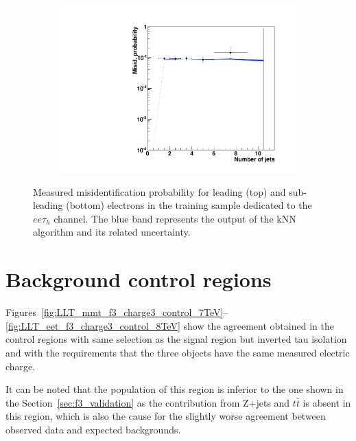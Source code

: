 \begin{figure}
\begin{subfigure}[b]{0.33\textwidth}
                \includegraphics[width=\textwidth]{4_Analisys/pics/8TeV/plots/fakerates/e_eet_subleading_kNN_numJets20.pdf}
                \caption{}
        \end{subfigure}
        \caption{Measured misidentification probability for leading (top) and sub-leading (bottom) electrons in the training sample dedicated to the $ee\tau_h$ channel. The blue band represents the output of the kNN algorithm and its related uncertainty.}\label{fig:fake_rate_eet}
\end{figure}

\section{Background control regions}

Figures~\ref{fig:LLT_mmt_f3_charge3_control_7TeV}--\ref{fig:LLT_eet_f3_charge3_control_8TeV} show the agreement obtained in the control regions with same selection as the signal region but inverted tau isolation and with the requirements that the three objects have the same measured electric charge.

It can be noted that the population of this region is inferior to the one shown in the Section~\ref{sec:f3_validation} as the contribution from Z+jets and $t\bar{t}$ is absent in this region, which is also the cause for the slightly worse agreement between observed data and expected backgrounds.

